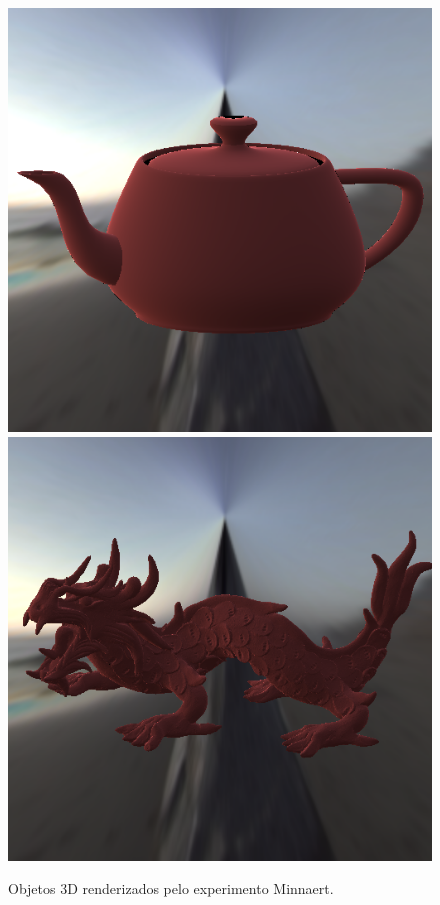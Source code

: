 \begin{figure}[H]
    \caption{\small{Objetos 3D renderizados pelo experimento Minnaert.}}\label{fig-minnaert-eqlang}
  \includegraphics[width=\linewidth]{./Imagens/brdfs/minnaert-teapot.png}
\endminipage\hfill
{}
  \includegraphics[width=\linewidth]{./Imagens/brdfs/minnaert-dragon.png}

\end{figure}
